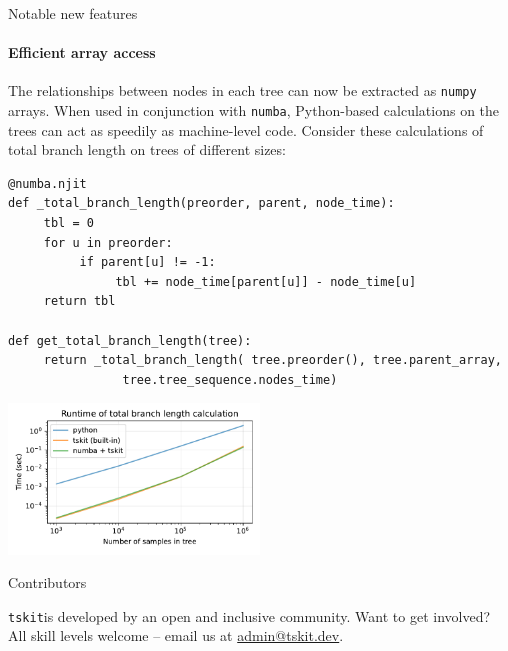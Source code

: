 \documentclass[landscape,a0paper,fontscale=0.4]{baposter}
\newcommand{\tskit}{{\texttt{tskit}}}
\begin{document}
\begin{poster}
\begin{posterbox}[name=operations,column=3,below=stats,span=1]{Notable new features}
\paragraph{Efficient array access}
The relationships between nodes in each tree can now be extracted as \texttt{numpy}
    arrays. When used in conjunction with \texttt{numba},
    Python-based calculations on the trees can act as speedily as
    machine-level code. Consider these calculations of total branch length on
    trees of different sizes:

\begin{multicols}{2}
\begin{verbatim}
@numba.njit
def _total_branch_length(preorder, parent, node_time):
     tbl = 0
     for u in preorder:
          if parent[u] != -1:
               tbl += node_time[parent[u]] - node_time[u]
     return tbl

def get_total_branch_length(tree):
     return _total_branch_length( tree.preorder(), tree.parent_array,
                tree.tree_sequence.nodes_time)
\end{verbatim}

\includegraphics[width=0.5\textwidth]{numba_runtime}
\end{multicols}

\end{posterbox}



\begin{posterbox}[name=refs,column=2,above=bottom]{Contributors}

    \tskit is developed by an open and inclusive community.
    Want to get involved?
    All skill levels welcome -- email us at \url{admin@tskit.dev}.


\end{posterbox}
\end{poster}
\end{document}
